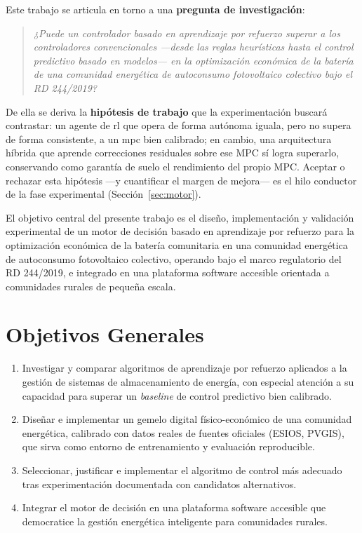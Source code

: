 \documentclass[12pt, a4paper, twoside]{report}
\begin{document}
Este trabajo se articula en torno a una \textbf{pregunta de investigación}:

\begin{quote}
\itshape ¿Puede un controlador basado en aprendizaje por refuerzo superar a los
controladores convencionales —desde las reglas heurísticas hasta el control
predictivo basado en modelos— en la optimización económica de la batería de una
comunidad energética de autoconsumo fotovoltaico colectivo bajo el RD 244/2019?
\end{quote}

De ella se deriva la \textbf{hipótesis de trabajo} que la experimentación
buscará contrastar: un agente de \acrshort{rl} que opera de forma autónoma
iguala, pero no supera de forma consistente, a un \acrshort{mpc} bien calibrado;
en cambio, una arquitectura híbrida que aprende correcciones residuales sobre
ese MPC sí logra superarlo, conservando como garantía de suelo el rendimiento
del propio MPC. Aceptar o rechazar esta hipótesis —y cuantificar el margen de
mejora— es el hilo conductor de la fase experimental (Sección~\ref{sec:motor}).

El objetivo central del presente trabajo es el diseño, implementación y
validación experimental de un motor de decisión basado en aprendizaje por
refuerzo para la optimización económica de la batería comunitaria en una
comunidad energética de autoconsumo fotovoltaico colectivo, operando bajo el
marco regulatorio del RD 244/2019, e integrado en una plataforma software
accesible orientada a comunidades rurales de pequeña escala.

\section{Objetivos Generales}

\begin{enumerate}[label=\textbf{OG\arabic*.}]
  \item Investigar y comparar algoritmos de aprendizaje por refuerzo aplicados
    a la gestión de sistemas de almacenamiento de energía, con especial atención
    a su capacidad para superar un \textit{baseline} de control predictivo bien
    calibrado.
  \item Diseñar e implementar un gemelo digital físico-económico de una comunidad
    energética, calibrado con datos reales de fuentes oficiales (ESIOS, PVGIS),
    que sirva como entorno de entrenamiento y evaluación reproducible.
  \item Seleccionar, justificar e implementar el algoritmo de control más adecuado
    tras experimentación documentada con candidatos alternativos.
  \item Integrar el motor de decisión en una plataforma software accesible que
    democratice la gestión energética inteligente para comunidades rurales.
\end{enumerate}
\end{document}
